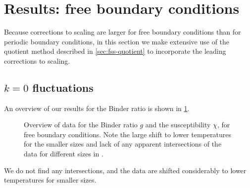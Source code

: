 \section{Results: free boundary conditions}
\label{sec:fss-results-fbc}

Because corrections to scaling are larger for free boundary conditions than for
periodic boundary conditions, in this section we make extensive use of the
quotient method described in \cref{sec:fss-quotient} to incorporate the
leading corrections to scaling.


\subsection{$k=0$ fluctuations}

An overview of our results for the Binder ratio is shown in
\cref{fig:data-f-binder}.
\begin{figure}
  \centering
  \begin{subfigure}{0.49\textwidth}
    \centering
    
    \subcaption{}\label{fig:data-f-binder}
  \end{subfigure}
  \begin{subfigure}{0.49\textwidth}
    \centering
    
    \subcaption{}\label{fig:data-f-susc}
  \end{subfigure}
  \caption[
    Data for the Binder ratio $g$ and the susceptibility $\chi$ for the
    five-dimensional Ising model with free boundary conditions.
  ]
  {
    Overview of data for  the Binder ratio $g$ and
     the susceptibility $\chi$, for free boundary
    conditions. Note the large shift to lower temperatures for the smaller
    sizes and lack of any apparent intersections of the data for different
    sizes in .
  } \label{fig:data-f}
\end{figure}
We do not find any intersections, and the data are shifted considerably to
lower temperatures for smaller sizes.

